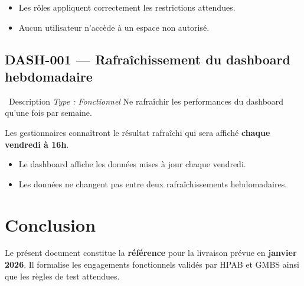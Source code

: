 \documentclass[12pt,a4paper]{article}
\newcommand{\checkmark}{\ding{51}}
\begin{document}
\begin{testbox}
\begin{itemize}[leftmargin=2em, itemsep=2pt]
    \item[\checkmark] Les rôles appliquent correctement les restrictions attendues.
    \item[\checkmark] Aucun utilisateur n'accède à un espace non autorisé.
\end{itemize}
\end{testbox}

\subsection{DASH-001 — Rafraîchissement du dashboard hebdomadaire}
\label{subsec:dash-001}

\begin{featurebox}{\faChartBar\ Description \hfill \textit{Type : Fonctionnel}}
Ne rafraîchir les performances du dashboard qu'une fois par semaine.

\vspace{0.3cm}
Les gestionnaires connaîtront le résultat rafraîchi qui sera affiché \textbf{chaque vendredi à 16h}.
\end{featurebox}

\begin{testbox}
\begin{itemize}[leftmargin=2em, itemsep=2pt]
    \item[\checkmark] Le dashboard affiche les données mises à jour chaque vendredi.
    \item[\checkmark] Les données ne changent pas entre deux rafraîchissements hebdomadaires.
\end{itemize}
\end{testbox}

\section{Conclusion}

Le présent document constitue la \textbf{référence} pour la livraison prévue en \textbf{janvier 2026}. Il formalise les engagements fonctionnels validés par HPAB et GMBS ainsi que les règles de test attendues.

\vspace{1cm}
\end{document}
